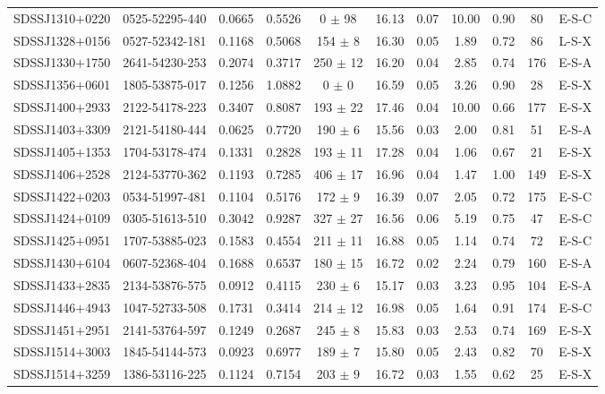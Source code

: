 \documentclass{emulateapj}
\begin{document}
\begin{table*}[htbp]
\begin{center}
\begin{tabular}{c c c c c c c c c c c}
SDSSJ1310$+$0220 & 0525-52295-440 & 0.0665 & 0.5526 & 0 $\pm$   98 & 16.13 & 0.07 & 10.00 & 0.90 & 80 & E-S-C \\ 
SDSSJ1328$+$0156 & 0527-52342-181 & 0.1168 & 0.5068 & 154 $\pm$    8 & 16.30 & 0.05 & 1.89 & 0.72 & 86 & L-S-X \\ 
SDSSJ1330$+$1750 & 2641-54230-253 & 0.2074 & 0.3717 & 250 $\pm$   12 & 16.20 & 0.04 & 2.85 & 0.74 & 176 & E-S-A \\ 
SDSSJ1356$+$0601 & 1805-53875-017 & 0.1256 & 1.0882 & 0 $\pm$    0 & 16.59 & 0.05 & 3.26 & 0.90 & 28 & E-S-X \\ 
SDSSJ1400$+$2933 & 2122-54178-223 & 0.3407 & 0.8087 & 193 $\pm$   22 & 17.46 & 0.04 & 10.00 & 0.66 & 177 & E-S-X \\ 
SDSSJ1403$+$3309 & 2121-54180-444 & 0.0625 & 0.7720 & 190 $\pm$    6 & 15.56 & 0.03 & 2.00 & 0.81 & 51 & E-S-A \\ 
SDSSJ1405$+$1353 & 1704-53178-474 & 0.1331 & 0.2828 & 193 $\pm$   11 & 17.28 & 0.04 & 1.06 & 0.67 & 21 & E-S-X \\ 
SDSSJ1406$+$2528 & 2124-53770-362 & 0.1193 & 0.7285 & 406 $\pm$   17 & 16.96 & 0.04 & 1.47 & 1.00 & 149 & E-S-X \\ 
SDSSJ1422$+$0203 & 0534-51997-481 & 0.1104 & 0.5176 & 172 $\pm$    9 & 16.39 & 0.07 & 2.05 & 0.72 & 175 & E-S-C \\ 
SDSSJ1424$+$0109 & 0305-51613-510 & 0.3042 & 0.9287 & 327 $\pm$   27 & 16.56 & 0.06 & 5.19 & 0.75 & 47 & E-S-C \\ 
SDSSJ1425$+$0951 & 1707-53885-023 & 0.1583 & 0.4554 & 211 $\pm$   11 & 16.88 & 0.05 & 1.14 & 0.74 & 72 & E-S-C \\ 
SDSSJ1430$+$6104 & 0607-52368-404 & 0.1688 & 0.6537 & 180 $\pm$   15 & 16.72 & 0.02 & 2.24 & 0.79 & 160 & E-S-A \\ 
SDSSJ1433$+$2835 & 2134-53876-575 & 0.0912 & 0.4115 & 230 $\pm$    6 & 15.17 & 0.03 & 3.23 & 0.95 & 104 & E-S-A \\ 
SDSSJ1446$+$4943 & 1047-52733-508 & 0.1731 & 0.3414 & 214 $\pm$   12 & 16.98 & 0.05 & 1.64 & 0.91 & 174 & E-S-C \\ 
SDSSJ1451$+$2951 & 2141-53764-597 & 0.1249 & 0.2687 & 245 $\pm$    8 & 15.83 & 0.03 & 2.53 & 0.74 & 169 & E-S-X \\ 
SDSSJ1514$+$3003 & 1845-54144-573 & 0.0923 & 0.6977 & 189 $\pm$    7 & 15.80 & 0.05 & 2.43 & 0.82 & 70 & E-S-X \\ 
SDSSJ1514$+$3259 & 1386-53116-225 & 0.1124 & 0.7154 & 203 $\pm$    9 & 16.72 & 0.03 & 1.55 & 0.62 & 25 & E-S-X \\ 

\end{tabular}
\end{center}
\end{table*}
\end{document}
